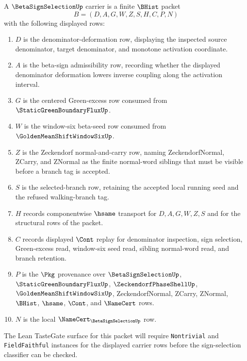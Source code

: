 \begin{definition}
\label{def:beta-sign-selection-carrier}
A $\BetaSignSelectionUp$ carrier is a finite $\BHist$ packet
$$
B=(D,A,G,W,Z,S,H,C,P,N)
$$
with the following displayed rows:
\begin{enumerate}
\item $D$ is the denominator-deformation row, displaying the inspected source denominator, target denominator, and monotone activation coordinate.
\item $A$ is the beta-sign admissibility row, recording whether the displayed denominator deformation lowers inverse coupling along the activation interval.
\item $G$ is the centered Green-excess row consumed from $\StaticGreenBoundaryFluxUp$.
\item $W$ is the window-six beta-seed row consumed from $\GoldenMeanShiftWindowSixUp$.
\item $Z$ is the Zeckendorf normal-and-carry row, naming ZeckendorfNormal, ZCarry, and ZNormal as the finite normal-word siblings that must be visible before a branch tag is accepted.
\item $S$ is the selected-branch row, retaining the accepted local running seed and the refused walking-branch tag.
\item $H$ records componentwise $\hsame$ transport for $D,A,G,W,Z,S$ and for the structural rows of the packet.
\item $C$ records displayed $\Cont$ replay for denominator inspection, sign selection, Green-excess read, window-six seed read, sibling normal-word read, and branch retention.
\item $P$ is the $\Pkg$ provenance over $\BetaSignSelectionUp$, $\StaticGreenBoundaryFluxUp$, $\ZeckendorfPhaseShellUp$, $\GoldenMeanShiftWindowSixUp$, ZeckendorfNormal, ZCarry, ZNormal, $\BHist$, $\hsame$, $\Cont$, and $\NameCert$ rows.
\item $N$ is the local $\NameCert_{\BetaSignSelectionUp}$ row.
\end{enumerate}
The Lean TasteGate surface for this packet will require \texttt{Nontrivial} and \texttt{FieldFaithful} instances for the displayed carrier rows before the sign-selection classifier can be checked.
\end{definition}


